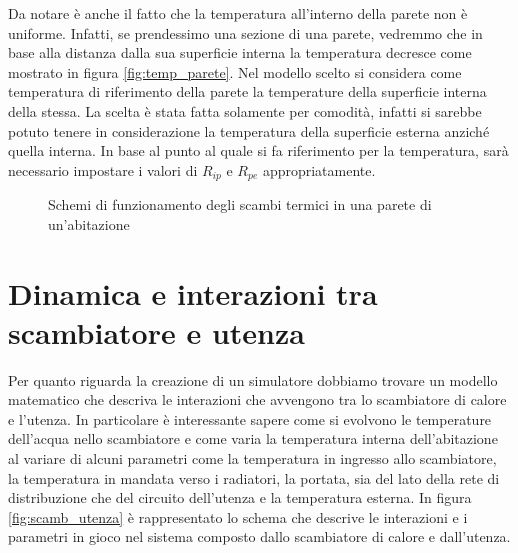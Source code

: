 \documentclass[laurea,oneside,11pt]{USiena_tesiLM}
\begin{document}
Da notare è anche il fatto che la temperatura all'interno della parete non è uniforme. Infatti, se prendessimo una sezione di una parete, vedremmo che in base alla distanza dalla sua superficie interna la temperatura decresce come mostrato in figura \ref{fig:temp_parete}.  Nel modello scelto si considera come temperatura di riferimento della parete la temperature della superficie interna della stessa. La scelta è stata fatta solamente per comodità, infatti si sarebbe potuto tenere in considerazione la temperatura della superficie esterna anziché quella interna. In base al punto al quale si fa riferimento per la temperatura, sarà necessario impostare  i valori di $R_{ip}$ e $R_{pe}$ appropriatamente.   

 \begin{figure}[h]
 \centering
 \hspace{5mm}
 \caption{Schemi di funzionamento degli scambi termici in una parete di un'abitazione}
 \end{figure}



\section{Dinamica e interazioni tra scambiatore e utenza}
Per quanto riguarda la creazione di un simulatore dobbiamo trovare un modello matematico che descriva le interazioni che avvengono tra lo scambiatore di calore e l'utenza. In particolare è interessante sapere come si evolvono le temperature dell'acqua nello scambiatore e come varia la temperatura interna dell'abitazione al variare di alcuni parametri come la temperatura in ingresso allo scambiatore, la temperatura in mandata verso i radiatori, la portata, sia del lato della rete di distribuzione che del circuito dell'utenza e la temperatura esterna.
In figura \ref{fig:scamb_utenza} è rappresentato lo schema che descrive le interazioni e i parametri in gioco nel sistema composto dallo scambiatore di calore e dall'utenza. 
\end{document}
